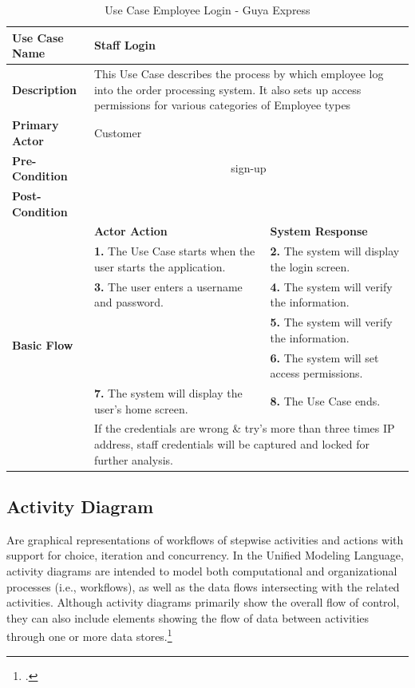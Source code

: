 \begin{table}[!h]
\begin{tabular}{|l|p{6cm}|p{6cm}|}
\hline 
\rule[-1ex]{0pt}{2.5ex} \textbf{Use Case Name} & \multicolumn{2}{p{10cm}|}{Staff Login} \\ 
\hline 
\rule[-1ex]{0pt}{2.5ex} \textbf{Description} &\multicolumn{2}{p{10cm}|}{This Use Case describes the process by which employee log into the order processing system. It also sets up access permissions for various categories of Employee types} \\ 
\hline 
\rule[-1ex]{0pt}{2.5ex} \textbf{Primary Actor}& \multicolumn{2}{p{10cm}|}{Customer} \\ 
\hline 
\rule[-1ex]{0pt}{2.5ex} \textbf{Pre-Condition} & \multicolumn{2}{c|}{sign-up} \\ 
\hline 
\rule[-1ex]{0pt}{2.5ex} \textbf{Post-Condition} & \multicolumn{2}{p{10cm}|}{}  \\ 
\hline 
\multirow{8}{*}{\textbf{Basic Flow}} & \textbf{Actor Action} & \textbf{System Response}\\
%
&
\textbf{1.}  The Use Case starts when the user starts the application.
& 
\textbf{2.}  The system will display the login screen.
\\
%
&
\textbf{3.}  The user enters a username and password.
& 
\textbf{4.}  The system will verify the information. 
\\
%
&

& 
\textbf{5.}  The system will verify the information. 
\\
%
&

& 
\textbf{6.}  The system will set access permissions. 
\\
%
&
\textbf{7.}  The system will display the user's home screen.
& 
\textbf{8.}  The Use Case ends. 
\\
\hline 
\rule[-1ex]{0pt}{2.5ex} \textbf{Alternate Flow} & \multicolumn{2}{p{10cm}|}{If the credentials are wrong \& try's more than three times IP address, staff credentials will be captured and locked for further analysis.}  \\ 
\hline 
\end{tabular}
\caption{Use Case Employee Login - Guya Express} 
\end{table}



\clearpage
\subsection{Activity Diagram}
Are graphical representations of workflows of stepwise activities and actions with support for choice, iteration and concurrency. In the Unified Modeling Language, activity diagrams are intended to model both computational and organizational processes (i.e., workflows), as well as the data flows intersecting with the related activities. Although activity diagrams primarily show the overall flow of control, they can also include elements showing the flow of data between activities through one or more data stores.\footcite{wikiactivitydiagram}

